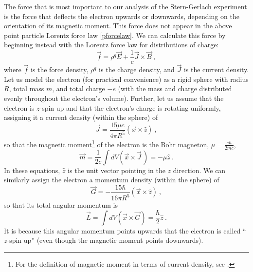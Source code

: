 \documentclass[onecolumn,secnumarabic,amsmath,amssymb,balancelastpage,nofootinbib]{article}
\begin{document}
The force that is most important to our analysis of the Stern-Gerlach experiment is the force that deflects the electron upwards or downwards, depending on the orientation of its magnetic moment.  This force does not appear in the above point particle Lorentz force law \eqref{pforcelaw}.  We can calculate this force by beginning instead with the Lorentz force law for distributions of charge:
\begin{equation}
\vec{f}= \rho^q  \vec{E} + \frac{1}{c} \vec{J} \times \vec{B}
\ ,
\label{cforcelaw}
\end{equation}
where $\vec{f}$ is the force density, $\rho^q$ is the charge density, and $\vec{J}$ is the current density.  Let us model the electron (for practical convenience) as a rigid sphere with radius $R$, total mass $m$, and total charge $-e$ (with the mass and charge distributed evenly throughout the electron's volume).  Further, let us assume that the electron is $z$-spin up and that the electron's charge is rotating uniformly, assigning it a current density (within the sphere) of
\begin{equation}
\vec{J}=\frac{15 \mu c}{4 \pi R^5} ( \vec{x}\times \hat{z} )
\ ,
\label{zupcurrentsphere}
\end{equation}
so that the magnetic moment\footnote{For the definition of magnetic moment in terms of current density, see \citet[sec.\ 5.6]{jackson}.} of the electron is the Bohr magneton, $\mu=\frac{e \hbar}{2 m c}$,
\begin{equation}
\vec{m}=\frac{1}{2c}\int dV \left(\vec{x} \times \vec{J}\,\right)=-\mu \hat{z}
\ .
\label{zupmagneticmoment}
\end{equation}
In these equations, $\hat{z}$ is the unit vector pointing in the $z$ direction.  We can similarly assign the electron a momentum density (within the sphere) of
\begin{equation}
\vec{G}=-\frac{15 \hbar}{16 \pi R^5} ( \vec{x}\times \hat{z} )
\ ,
\label{zupmomentumsphere}
\end{equation}
so that its total angular momentum is
\begin{equation}
\vec{L}=\int dV \left(\vec{x} \times \vec{G}\right)=\frac{\hbar}{2}\hat{z}
\ .
\label{zupangularmomentum}
\end{equation}
It is because this angular momentum points upwards that the electron is called ``$z$-spin up'' (even though the magnetic moment points downwards).
\end{document}
